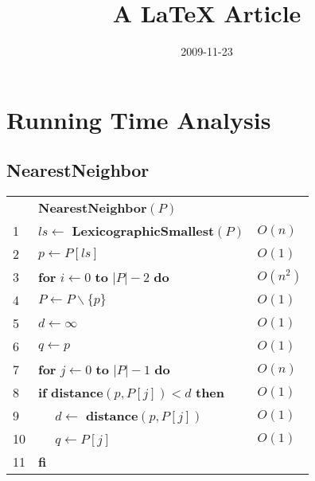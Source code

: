 \documentclass[]{article}
\title{A LaTeX Article}
\author{  }
\date{2009-11-23}
\begin{document}
\ifpdf
{}
\else
{}
\fi

\maketitle

\section{Running Time Analysis} %
\label{sec:running_time_analysis}
  \subsection{NearestNeighbor} %
  \label{sub:nearestneighbor}

     \begin{tabular}{l l l}
      & \textbf{NearestNeighbor}$(P)$                                                &   \\
      1 & $ls \gets$ \textbf{LexicographicSmallest}$(P)$                                & $O(n)$    \\ 
      2 & $p \gets P[ls]$                                                               & $O(1)$    \\ 
      3 & \textbf{for} $i \gets 0$ \textbf{to} $|P| - 2$ \textbf{do}                    & $O(n^{2})$  \\ 
      4 & \qquad $P \gets P \backslash \{ p \}$                                           & $O(1)$    \\ 
      5 & \qquad $d \gets \infty$                                                         & $O(1)$    \\ 
      6 & \qquad $q \gets p $                                                             & $O(1)$    \\ 
      7 & \qquad \textbf{for} $j \gets 0$ \textbf{to} $|P| - 1$ \textbf{do}               & $O(n)$    \\ 
      8 & \qquad \qquad \textbf{if} \textbf{distance}$(p, P[j]) < d$ \textbf{then}          & $O(1)$    \\ 
      9 & \qquad \qquad ~~ $d \gets$ \textbf{distance}$(p, P[j])$                           & $O(1)$    \\ 
      10 & \qquad \qquad ~~ $q \gets P[j]$                                                   & $O(1)$    \\ 
      11 & \qquad \qquad \textbf{fi}                                                         &           \\ 

\end{tabular}
\end{document}
